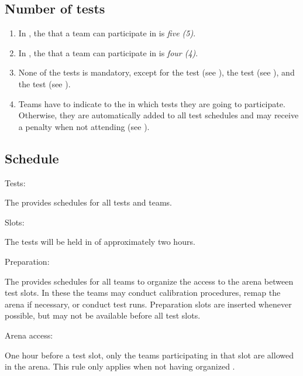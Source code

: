 \subsection{Number of tests}\label{rule:number_of_tests}

\begin{enumerate}
\item In , the  that a team can participate in is \emph{five (5)}.
\item In , the  that a team can participate in is \emph{four (4)}.
\item None of the tests is mandatory, except for the  test (see ), the  test (see ), and the  test (see ).
\item Teams have to indicate to the  in which tests they are going to participate. 
  Otherwise, they are automatically added to all test schedules and 
  may receive a penalty when not attending (see ).
\end{enumerate}


\subsection{Schedule}\label{rule:schedule}

\begin{enumerate}
{\bf\item Tests:} The  provides schedules for all tests and teams. 
{\bf\item Slots:} The tests will be held in  of approximately two hours.  
{\bf\item Preparation:} The  provides schedules for all teams to organize the access to the arena between test slots.
In these  the teams may conduct calibration procedures, remap the arena if necessary, or conduct test runs.
Preparation slots are inserted whenever possible, but may not be available before all test slots. 
{\bf\item Arena access:} One hour before a test slot, only the teams participating in that slot are allowed in the arena.
This rule only applies when not having organized .   
\end{enumerate}



